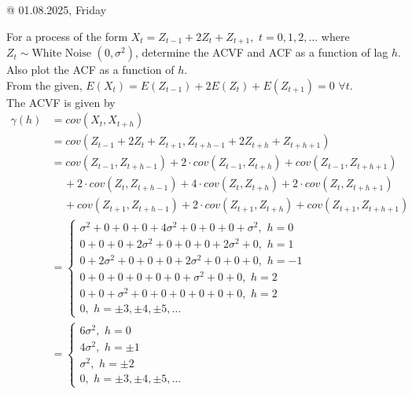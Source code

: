\documentclass[11pt, a4paper]{article}
\begin{document}
\begin{flushright}
\textcolor{col2}{@ 01.08.2025, Friday}
\end{flushright}

\bclampe \hspace{0.1cm} For a process of the form $X_t = Z_{t-1} + 2 Z_t + Z_{t+1}, \,\, t = 0, 1, 2, \ldots$ where $Z_t \sim \text{White Noise } (0, \sigma^2)$, determine the ACVF and ACF as a function of lag $h$. Also plot the ACF as a function of $h$. \\

\bcplume \hspace{0.1cm} From the given, $E(X_t) = E(Z_{t-1}) + 2 E(Z_t) + E(Z_{t+1}) = 0 \,\, \forall t$. \\

The ACVF is given by
\begin{align*}
\gamma(h) &= cov(X_t, X_{t+h}) \\[0.25em]
&= cov(Z_{t-1} + 2 Z_t + Z_{t+1}, Z_{t+h-1} + 2 Z_{t+h} + Z_{t+h+1}) \\[0.25em]
&= cov(Z_{t-1}, Z_{t+h-1}) + 2 \cdot cov(Z_{t-1}, Z_{t+h}) + cov(Z_{t-1}, Z_{t+h+1}) \\
& \,\,\,\,\,\,\, + 2 \cdot cov(Z_t, Z_{t+h-1}) + 4 \cdot cov(Z_{t}, Z_{t+h}) + 2 \cdot cov(Z_{t}, Z_{t+h+1}) \\
& \,\,\,\,\,\,\, + cov(Z_{t+1}, Z_{t+h-1}) + 2 \cdot cov(Z_{t+1}, Z_{t+h}) + cov(Z_{t+1}, Z_{t+h+1}) \\[1em]
&= \begin{cases}
\sigma^2 + 0 + 0 + 0 + 4 \sigma^2 + 0 + 0 + 0 + \sigma^2, \,\, h = 0 \\
0 + 0 + 0 + 2 \sigma^2 + 0 + 0 + 0 + 2 \sigma^2 + 0, \,\, h = 1 \\
0 + 2 \sigma^2 + 0 + 0 + 0 + 2 \sigma^2 + 0 + 0 + 0, \,\, h = -1 \\
0 + 0 + 0 + 0 + 0 + 0 + \sigma^2 + 0 + 0, \,\, h = 2 \\
0 + 0 + \sigma^2 + 0 + 0 + 0 + 0 + 0 + 0, \,\, h = 2 \\
0, \,\, h = \pm 3, \pm 4, \pm 5, \ldots
\end{cases} \\[1em]
&= \begin{cases}
6\sigma^2, \,\, h = 0 \\
4\sigma^2, \,\, h = \pm 1 \\
\sigma^2, \,\, h = \pm 2 \\
0, \,\, h = \pm 3, \pm 4, \pm 5, \ldots
\end{cases}
\end{align*}
\\
\end{document}
